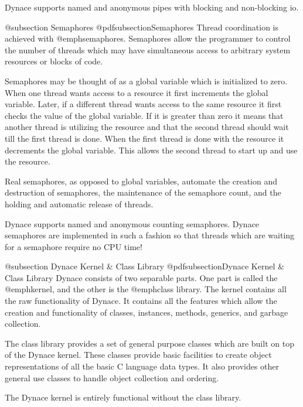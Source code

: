 Dynace supports named and anonymous pipes with blocking and non-blocking
io.

@subsection Semaphores
@pdfsubsection{Semaphores}
Thread coordination is achieved with @emph{semaphores}.  Semaphores allow
the programmer to control the number of threads which may have simultaneous
access to arbitrary system resources or blocks of code.

Semaphores may be thought of as a global variable which is initialized
to zero.  When one thread wants access to a resource it first increments
the global variable.  Later, if a different thread wants access to the
same resource it first checks the value of the global variable.  If it
is greater than zero it means that another thread is utilizing the
resource and that the second thread should wait till the first thread is
done.  When the first thread is done with the resource it decrements the
global variable.  This allows the second thread to start up and use
the resource.

Real semaphores, as opposed to global variables, automate the creation and
destruction of semaphores, the maintenance of the semaphore count, and
the holding and automatic release of threads.

Dynace supports named and anonymous counting semaphores.  Dynace semaphores
are implemented in such a fashion so that threads which are waiting for
a semaphore require no CPU time!

@subsection Dynace Kernel & Class Library
@pdfsubsection{Dynace Kernel & Class Library}
Dynace consists of two separable parts.  One part is called the @emph{kernel},
and the other is the @emph{class library}.  The kernel contains all the
raw functionality of Dynace.  It contains all the features which allow the
creation and functionality of classes, instances, methods, generics, and
garbage collection.  

The class library provides a set of general purpose classes which are
built on top of the Dynace kernel.  These classes provide basic facilities
to create object representations of all the basic C language data types.
It also provides other general use classes to handle object collection
and ordering.

The Dynace kernel is entirely functional without the class library.

